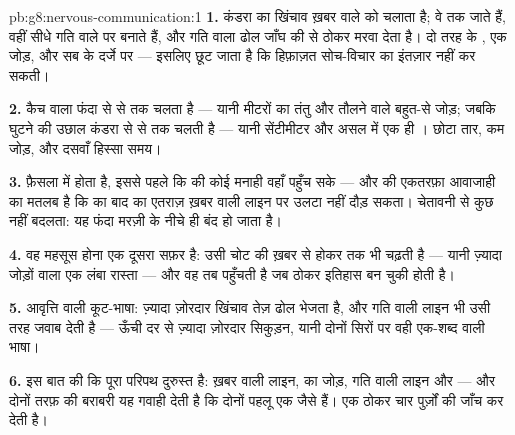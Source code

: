 \begin{solution}{pb:g8:nervous-communication:1}
\textbf{1.} कंडरा का खिंचाव ख़बर वाले  को चलाता है; वे
\emph{} तक जाते हैं, वहीं सीधे गति वाले  पर
 बनाते हैं, और गति वाला ढोल जाँघ की  से ठोकर मरवा देता
है। दो तरह के , एक जोड़, और सब  के दर्जे पर --- 
इसलिए छूट जाता है कि हिफ़ाज़त सोच-विचार का इंतज़ार नहीं कर सकती।

\textbf{2.} कैच वाला फंदा  से  से  तक चलता है --- यानी
मीटरों का तंतु और तौलने वाले बहुत-से जोड़; जबकि घुटने की उछाल कंडरा से
 से  तक चलती है --- यानी सेंटीमीटर और असल में एक ही
। छोटा तार, कम जोड़, और दसवाँ हिस्सा समय।

\textbf{3.} फ़ैसला  में होता है, इससे पहले कि  की कोई
मनाही वहाँ पहुँच सके --- और  की एकतरफ़ा आवाजाही का मतलब
है कि  का बाद का एतराज़ ख़बर वाली लाइन पर उलटा नहीं दौड़ सकता।
चेतावनी से कुछ नहीं बदलता: यह फंदा मरज़ी के नीचे ही बंद हो जाता है।

\textbf{4.} वह महसूस होना एक दूसरा सफ़र है: उसी चोट की ख़बर  से
होकर  तक भी चढ़ती है --- यानी ज़्यादा जोड़ों वाला एक लंबा रास्ता
--- और वह तब पहुँचती है जब ठोकर इतिहास बन चुकी होती है।

\textbf{5.} आवृत्ति वाली कूट-भाषा: ज़्यादा ज़ोरदार खिंचाव तेज़ ढोल भेजता
है, और गति वाली लाइन भी उसी तरह जवाब देती है --- ऊँची दर से ज़्यादा
ज़ोरदार सिकुड़न, यानी दोनों सिरों पर वही एक-शब्द वाली भाषा।

\textbf{6.} इस बात की कि पूरा परिपथ दुरुस्त है: ख़बर वाली लाइन,
 का जोड़, गति वाली लाइन और  --- और दोनों तरफ़ की बराबरी यह
गवाही देती है कि दोनों पहलू एक जैसे हैं। एक ठोकर चार पुर्ज़ों की जाँच कर
देती है।


\end{solution}
